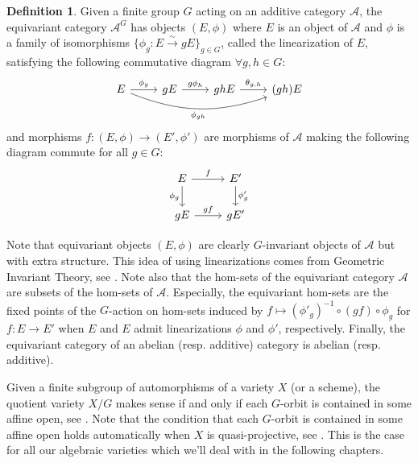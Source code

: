 \documentclass[10pt]{amsart}
\theoremstyle{definition}
\newtheorem{definition}[theorem]{Definition}
\begin{document}
\begin{definition}{\label{def:equivcats}}
    Given a finite group $G$ acting on an additive category $\mathcal{A}$, the equivariant category $\mathcal{A}^G$ has objects $(E, \phi)$ where $E$ is an object of $\mathcal{A}$ and $\phi$ is a family of isomorphisms $\{ \phi_g : E \xrightarrow[]{\sim} gE \}_{g\in G}$, called the linearization of $E$, satisfying the following commutative diagram $\forall g,h \in G$: 
    \begin{equation*}
        \begin{tikzcd}
            E \arrow[r, "\phi_g"] \arrow[rrr, bend right=20, "\phi_{gh}"'] & gE \arrow[r, "g\phi_h"] & ghE \arrow[r, "\theta_{g,h}"] & (gh)E
        \end{tikzcd}
    \end{equation*}
   and morphisms $f\colon (E,\phi) \rightarrow (E', \phi')$ are morphisms of $\mathcal{A}$ making the following diagram commute for all $ g \in G$:
    \begin{equation*}
        \begin{tikzcd}
            E \arrow[r, "f"] \arrow[d,"\phi_g"'] & E' \arrow[d, "\phi'_g"] \\
            gE \arrow[r, "g f"] & gE'
        \end{tikzcd}
    \end{equation*}    
\end{definition}
Note that equivariant objects $(E,\phi)$ are clearly $G$-invariant objects of $\mathcal{A}$ but with extra structure. This idea of using linearizations comes from Geometric Invariant Theory, see 
\cite[Ch.1]{MR1304906}. Note also that the hom-sets of the equivariant category $\mathcal{A}$ are subsets of the hom-sets of $\mathcal{A}$. Especially, the equivariant hom-sets are the fixed points of the $G$-action on hom-sets induced by $f \mapsto (\phi'_g)^{-1} \circ(gf) \circ \phi_g$ for $f \colon E \to E' $ when $E$ and $E$ admit linearizations $\phi$ and $\phi'$, respectively. Finally, the equivariant category of an abelian (resp. additive) category is abelian (resp. additive).

Given a finite subgroup of automorphisms of a variety $X$ (or a scheme), the quotient variety $X/G$ makes sense if and only if each $G$-orbit is contained in some affine open, see \cite[Expos\'{e} V, Proposition 1.8]{SGA1}.
Note that the condition that each $G$-orbit is contained in some affine open holds automatically when $X$ is quasi-projective, see \cite[Chapter II, Paragraph 7, Remark]{MumfordAbelian}. This is the case for all our algebraic varieties which we'll deal with in the following chapters.
\end{document}
